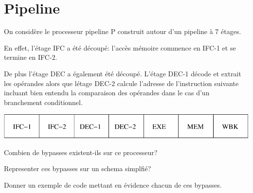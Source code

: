 %
%

\section{Pipeline}

On consid\`ere le processeur pipeline P construit autour d'un pipeline
\`a 7 \'etages.

En effet, l'\'etage IFC a \'et\'e d\'ecoup\'e: l'acc\`es m\'emoire commence
en IFC-1 et se termine en IFC-2.

De plus l'\'etage DEC a \'egalement \'et\'e d\'ecoup\'e. L'\'etage
DEC-1 d\'ecode et extrait les op\'erandes alors que l\'etage DEC-2 calcule
l'adresse de l'instruction suivante incluant bien entendu la comparaison
des op\'erandes dans le cas d'un branchement conditionnel.

\begin{center}
  \includegraphics[scale=0.8]{figures/pipeline.pdf}
\end{center}

Combien de bypasses existent-ils sur ce processeur?

Representer ces bypasses sur un schema simplfi\'e?

Donner un exemple de code mettant en \'evidence chacun de ces bypasses.

